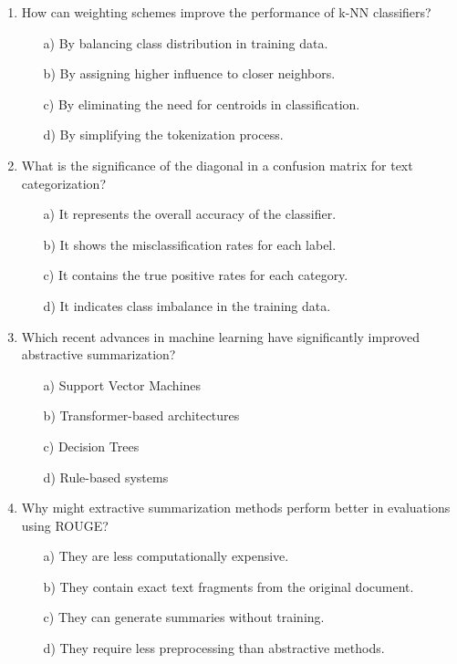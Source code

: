 \documentclass[8pt]{extarticle}
\begin{document}
\begin{multicols}{2}
\begin{enumerate}
\item How can weighting schemes improve the performance of k-NN classifiers?
\begin{itemize}
\item[a)] By balancing class distribution in training data.
\item[b)] By assigning higher influence to closer neighbors.
\item[c)] By eliminating the need for centroids in classification.
\item[d)] By simplifying the tokenization process.
\end{itemize}


\item What is the significance of the diagonal in a confusion matrix for text categorization?
\begin{itemize}
\item[a)] It represents the overall accuracy of the classifier.
\item[b)] It shows the misclassification rates for each label.
\item[c)] It contains the true positive rates for each category.
\item[d)] It indicates class imbalance in the training data.
\end{itemize}


\item Which recent advances in machine learning have significantly improved abstractive summarization?
\begin{itemize}
\item[a)] Support Vector Machines
\item[b)] Transformer-based architectures
\item[c)] Decision Trees
\item[d)] Rule-based systems
\end{itemize}


\item Why might extractive summarization methods perform better in evaluations using ROUGE?
\begin{itemize}
\item[a)] They are less computationally expensive.
\item[b)] They contain exact text fragments from the original document.
\item[c)] They can generate summaries without training.
\item[d)] They require less preprocessing than abstractive methods.
\end{itemize}



\end{enumerate}
\end{multicols}
\end{document}
